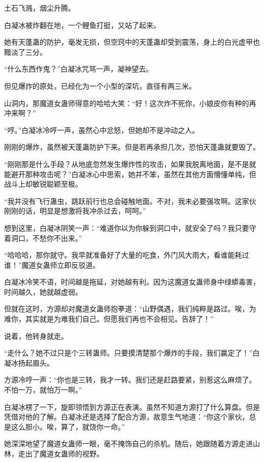 
\begin{this_body}

土石飞溅，烟尘升腾。

白凝冰被炸翻在地，一个鲤鱼打挺，又站了起来。

她有天蓬蛊的防护，毫发无损，但空窍中的天蓬蛊却受到震荡，身上的白光虚甲也黯淡了三分。

“什么东西作鬼？”白凝冰咒骂一声，凝神望去。

但见爆炸的原处，已经化为一个小型的深坑，直径有两三米。

山洞内，那魔道女蛊师得意的哈哈大笑：“好！这次炸不死你，小娘皮你有种的再冲来啊？”

“哼。”白凝冰冷哼一声，虽然心中忿怒，但她却不是冲动之人。

刚刚的爆炸，虽然被天蓬蛊防护下来。但是若再承担几次，恐怕天蓬蛊就要毁了。

“刚刚那是什么手段？从地底忽然发生爆炸性的攻击，如果我脱离地面，是不是就能避开那种攻击呢？”白凝冰心中思索，她并不笨，虽然在其他方面懵懂单纯，但战斗上却敏锐聪颖至极。

“我并没有飞行蛊虫，跳跃前行也总会碰触地面。不对，我未必要强攻啊。这家伙刚刚的话，明显是想激将我冲杀过去，呵呵。”

想到这里，白凝冰阴笑一声：“难道你以为你躲到洞口中，就安全了吗？我只要守着洞口，不愁你不出来。”

“哈哈哈，那你就守。我早就准备好了大量的吃食，外门风大雨大，看谁能耗过谁！”魔道女蛊师立即反驳道。

白凝冰冷笑不语，时间越是拖延，对她越有利。因为这魔道女蛊师身中绿蟒毒害，时间越久，她就越虚弱。

但就在这时，方源却对魔道女蛊师抱拳道：“山野偶遇，我们纯粹是路过。唉，为难你，其实就是为难我们自己。但愿我们再也不会相见。告辞了！”

说着，他转身就走。

“走什么？她不过只是个三转蛊师。只要摸清楚那个爆炸的手段，我们赢定了！”白凝冰扬起眉头。

方源冷哼一声：“你也是三转，我才一转。我们还是赶路要紧，别惹这么麻烦了。不怕一万，就怕万一啊。”

白凝冰楞了一下，旋即领悟到方源正在表演。虽然不知道方源打了什么算盘。但是凭借对他的了解。白凝冰还是选择了配合方源，故意生气地道：“你这个家伙，总是这么胆小。唉，算了，就饶你一命。”

她深深地望了魔道女蛊师一眼，毫不掩饰自己的杀机。随后，她跟随着方源走进山林，走出了魔道女蛊师的视野。


\end{this_body}
